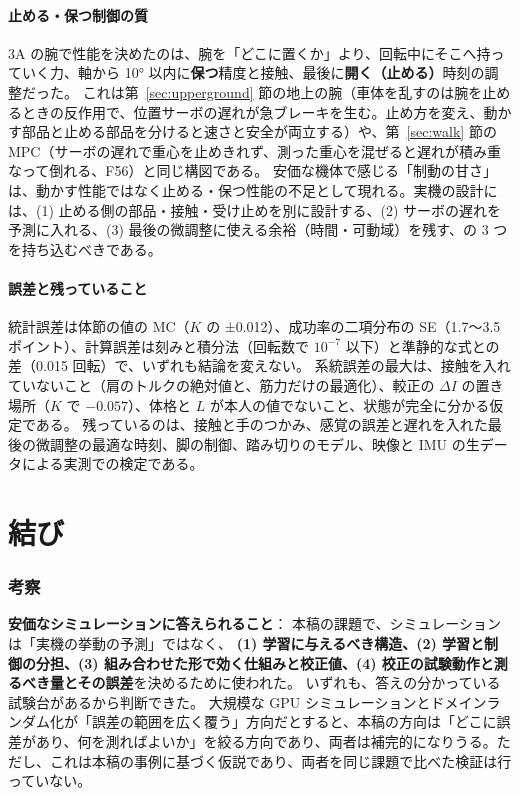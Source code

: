 \documentclass[paper=a4paper,fontsize=10pt,twocolumn,column_gap=2zw,line_length=24zw,number_of_lines=46,head_space=20mm]{jlreq}
\begin{document}
\subsection{止める・保つ制御の質}
3A の腕で性能を決めたのは、腕を「どこに置くか」より、回転中にそこへ持っていく力、軸から 10° 以内に\textbf{保つ}精度と接触、最後に\textbf{開く（止める）}時刻の調整だった。
これは第~\ref{sec:upperground} 節の地上の腕（車体を乱すのは腕を止めるときの反作用で、位置サーボの遅れが急ブレーキを生む。止め方を変え、動かす部品と止める部品を分けると速さと安全が両立する）や、第~\ref{sec:walk} 節の MPC（サーボの遅れで重心を止めきれず、測った重心を混ぜると遅れが積み重なって倒れる、F56）と同じ構図である。
安価な機体で感じる「制動の甘さ」は、動かす性能ではなく止める・保つ性能の不足として現れる。実機の設計には、(1) 止める側の部品・接触・受け止めを別に設計する、(2) サーボの遅れを予測に入れる、(3) 最後の微調整に使える余裕（時間・可動域）を残す、の 3 つを持ち込むべきである。


\subsection{誤差と残っていること}
統計誤差は体節の値の MC（$K$ の ±0.012）、成功率の二項分布の SE（1.7〜3.5 ポイント）、計算誤差は刻みと積分法（回転数で $10^{-7}$ 以下）と準静的な式との差（0.015 回転）で、いずれも結論を変えない。
系統誤差の最大は、接触を入れていないこと（肩のトルクの絶対値と、筋力だけの最適化）、較正の $\Delta I$ の置き場所（$K$ で $-0.057$）、体格と $L$ が本人の値でないこと、状態が完全に分かる仮定である。
残っているのは、接触と手のつかみ、感覚の誤差と遅れを入れた最後の微調整の最適な時刻、脚の制御、踏み切りのモデル、映像と IMU の生データによる実測での検定である。


\part*{結び}

\section{考察}\label{sec:discuss}

\textbf{安価なシミュレーションに答えられること}：
本稿の課題で、シミュレーションは「実機の挙動の予測」ではなく、
\textbf{(1) 学習に与えるべき構造、(2) 学習と制御の分担、(3) 組み合わせた形で効く仕組みと校正値、(4) 校正の試験動作と測るべき量とその誤差}を決めるために使われた。
いずれも、答えの分かっている試験台があるから判断できた。
大規模な GPU シミュレーションとドメインランダム化が「誤差の範囲を広く覆う」方向だとすると、本稿の方向は「どこに誤差があり、何を測ればよいか」を絞る方向であり、両者は補完的になりうる。ただし、これは本稿の事例に基づく仮説であり、両者を同じ課題で比べた検証は行っていない。
\end{document}

